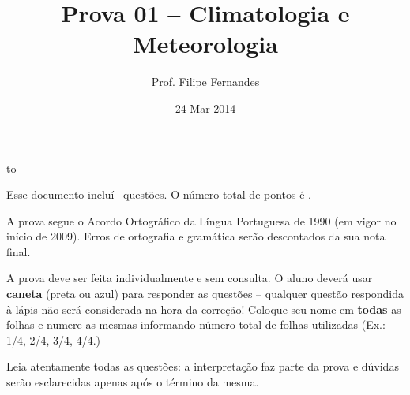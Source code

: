 \documentclass[letterpaper,portuguese,12pt,pdftex]{exam}
\title{Prova 01 -- Climatologia e Meteorologia}
\author{Prof. Filipe Fernandes}
\date{24-Mar-2014}
\begin{document}
\maketitle
\doublespacing

\vspace{1cm}
\hbox to \textwidth{Nome e número de matrícula:\enspace\hrulefill}
\vspace{1cm}

\begin{minipage}{.8\textwidth}
Esse documento incluí \numquestions\ questões. O número total de pontos é \numpoints.
\vspace{1cm}

A prova segue o Acordo Ortográfico da Língua Portuguesa de 1990 (em vigor no
início de 2009).  Erros de ortografia e gramática serão descontados da sua nota
final.

\vspace{1cm}

A prova deve ser feita individualmente e sem consulta.  O aluno deverá usar
{\bf caneta} (preta ou azul) para responder as questões -- qualquer questão
respondida à lápis não será considerada na hora da correção!  Coloque seu nome
em {\bf todas} as folhas e numere as mesmas informando número total de folhas
utilizadas (Ex.: 1/4, 2/4, 3/4, 4/4.)

\vspace{1cm}

Leia atentamente todas as questões: a interpretação faz parte da prova e dúvidas
serão esclarecidas apenas após o término da mesma.

\end{minipage}

\newpage
\end{document}
